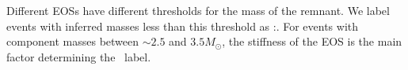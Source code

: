 Different \ac{EOS}s have different thresholds for the mass of the remnant. We label events with inferred masses less than this threshold as \hasrem:\true. For events with component masses between $\sim 2.5$ and $3.5 M_{\odot}$, the stiffness of the \ac{EOS} is the main factor determining the \hasrem\ label.
